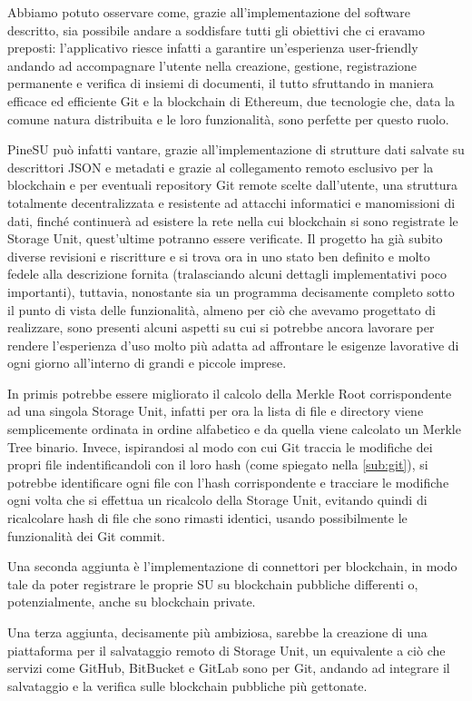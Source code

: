 \label{cap:sf}
Abbiamo potuto osservare come, grazie all'implementazione del software descritto,
sia possibile andare a soddisfare tutti gli obiettivi che ci eravamo preposti:
l'applicativo riesce infatti a garantire un'esperienza user-friendly andando ad 
accompagnare l'utente nella 
creazione, gestione, registrazione permanente e verifica di insiemi di documenti,
il tutto sfruttando in maniera efficace ed efficiente Git e la blockchain di Ethereum,
due tecnologie che, data la comune natura distribuita e le loro funzionalità,
sono perfette per questo ruolo.

PineSU può infatti vantare, grazie all'implementazione di strutture dati salvate
su descrittori JSON e metadati e grazie al collegamento remoto esclusivo per la blockchain
e per eventuali repository Git remote scelte dall'utente, una struttura totalmente
decentralizzata e resistente ad attacchi informatici e manomissioni di dati,
finché continuerà ad esistere la rete nella cui blockchain si sono registrate
le Storage Unit, quest'ultime potranno essere verificate.
Il progetto ha già subito diverse revisioni e riscritture e si trova ora in uno
stato ben definito e molto fedele alla descrizione fornita
(tralasciando alcuni dettagli implementativi poco importanti), tuttavia,
nonostante sia un programma
decisamente completo sotto il punto di vista delle funzionalità, almeno per ciò che
avevamo progettato di realizzare, sono presenti alcuni aspetti su cui si potrebbe
ancora lavorare per rendere l'esperienza d'uso molto più adatta ad affrontare le
esigenze lavorative di ogni giorno all'interno di grandi e piccole imprese.

In primis potrebbe essere migliorato il calcolo della Merkle Root corrispondente
ad una singola Storage Unit, infatti per ora la lista di file e directory viene
semplicemente ordinata in ordine alfabetico e da quella viene calcolato
un Merkle Tree binario. Invece, ispirandosi al modo con cui Git traccia le modifiche
dei propri file indentificandoli con il loro hash (come spiegato nella \autoref{sub:git}),
si potrebbe identificare ogni file con l'hash corrispondente e tracciare le modifiche ogni
volta che si effettua un ricalcolo della Storage Unit, evitando quindi di ricalcolare hash
di file che sono rimasti identici, usando possibilmente le funzionalità dei Git commit.

Una seconda aggiunta è l'implementazione di connettori per blockchain, in modo tale
da poter registrare le proprie SU su blockchain pubbliche differenti o, potenzialmente,
anche su blockchain private.

Una terza aggiunta, decisamente più ambiziosa, sarebbe la creazione di una piattaforma
per il salvataggio remoto di Storage Unit, un equivalente a ciò che servizi come GitHub,
BitBucket e GitLab sono per Git, andando ad integrare il salvataggio e la verifica sulle
blockchain pubbliche più gettonate.